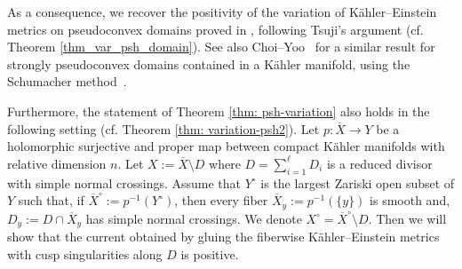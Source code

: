 \documentclass[a4paper, 11pt]{amsart}
\theoremstyle{plain}
\numberwithin{equation}{section} %
\numberwithin{figure}{section} %
\theoremstyle{plain}
\theoremstyle{plain}
\theoremstyle{plain}
\theoremstyle{plain}
\theoremstyle{remark}
\theoremstyle{definition}
\theoremstyle{definition}
\DeclareMathOperator \Ric {\textrm{Ric}}
\begin{document}
As a consequence, we recover the positivity of the variation of K\"ahler--Einstein metrics on pseudoconvex domains proved in \cite{Tsuji13-construction-KE-pseudoconvex, Choi15-variations-pseudoconvex, Choi_Yoo_2022}, following Tsuji's argument \cite{Tsuji13-construction-KE-pseudoconvex} (cf. Theorem \ref{thm_var_psh_domain}). See also Choi--Yoo~\cite{Choi_Yoo_2021} for a similar result for strongly pseudoconvex domains contained in a K\"ahler manifold, using the Schumacher method~\cite{Schumacher12-positivity-bundles}.

\medskip
Furthermore, the statement of Theorem \ref{thm: psh-variation} also holds in the following setting (cf. Theorem \ref{thm: variation-psh2}).   Let $p:\overline{X} \to Y$ be a holomorphic surjective and proper map between compact K\"ahler manifolds with relative dimension $n$. Let $X:=\overline{X}\setminus D$ where $D = \sum_{i=1}^\ell D_i$ is a reduced divisor with simple normal crossings. Assume that $Y^\circ$ is the largest Zariski open subset of $Y$ such that, if $\overline{X}^\circ := p^{-1}(Y^\circ)$, then every fiber $\overline{X}_y := p^{-1}(\{y\})$ is smooth and, $D_y:=D\cap {\overline{X}_y}$ has simple normal crossings. We denote $X^\circ=\overline{X}^\circ \setminus D $. Then we will show that the current obtained by gluing the fiberwise K\"ahler--Einstein metrics with cusp singularities along $D$ is positive.

\end{document}
